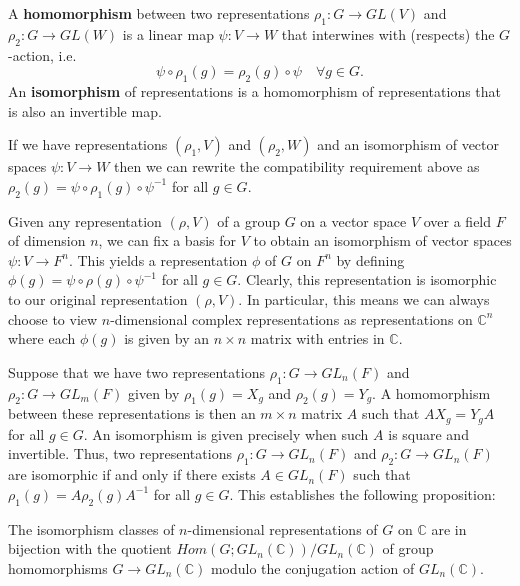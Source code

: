 
\begin{defn}
A \textbf{homomorphism} between two representations $\rho_1 \colon G \to GL(V)$ and $\rho_2 \colon G \to GL(W)$ is a linear map $\psi \colon V \to W$ that interwines with (respects) the $G$-action, i.e. 
\[ \psi \circ \rho_1 (g)= \rho_2(g) \circ \psi \quad \forall  g \in G. \]  
An \textbf{isomorphism} of representations is a homomorphism of representations that is also an invertible map.
\end{defn}
\begin{note}
If we have representations $(\rho_1, V)$ and $(\rho_2, W)$ and an isomorphism of vector spaces $\psi \colon V \to W$ then we can rewrite the compatibility requirement above as $\rho_2(g) = \psi \circ \rho_1(g) \circ \psi^{-1}$ for all $g \in G$.
\end{note}

Given any representation $(\rho, V)$ of a group $G$ on a vector space $V$ over a field $F$ of dimension $n$, we can fix a basis for $V$ to obtain an isomorphism of vector spaces $\psi \colon V \to F^n$.  This yields a representation $\phi$ of $G$ on $F^n$ by defining $\phi (g) = \psi \circ \rho(g) \circ \psi^{-1}$ for all $g \in G$. Clearly, this representation is isomorphic to our original representation $(\rho, V)$. In particular, this means we can always choose to view $n$-dimensional complex representations as representations on $\mathbb{C}^n$ where each $\phi(g)$ is given by an $n \times n$ matrix with entries in $\mathbb{C}$.

Suppose that we have two representations $\rho_1 \colon G \to GL_n(F)$ and $\rho_2 \colon G \to GL_m(F)$ given by $\rho_1(g) = X_g$ and $\rho_2(g) = Y_g$.  A homomorphism between these representations is then an $m \times n$ matrix $A$ such that $A X_g = Y_g A$ for all $g \in G$.   An isomorphism is given precisely when such $A$ is square and invertible.  Thus, two representations $\rho_1 \colon G \to GL_n(F)$ and $\rho_2 \colon G \to GL_n(F)$ are isomorphic if and only if there exists $A \in GL_n(F)$ such that $\rho_1(g) = A \rho_2(g) A^{-1}$ for all $g \in G$.  This establishes the following proposition:
\begin{prop} \label{iso-classes-of-reprns}
The isomorphism classes of $n$-dimensional representations of $G$ on $\mathbb{C}$ are in bijection with the quotient $Hom(G; GL_n(\mathbb{C})) / GL_n(\mathbb{C})$ of group homomorphisms $G \to GL_n(\mathbb{C})$ modulo the conjugation action of $GL_n(\mathbb{C})$.
\end{prop}

